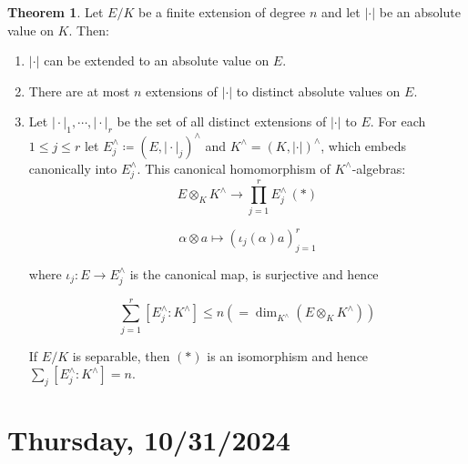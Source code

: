 \documentclass[openany]{amsbook}
\numberwithin{section}{chapter}
\theoremstyle{definition}
\newtheorem{theorem}{Theorem}[chapter]
\begin{document}
\begin{theorem}
    Let \(E / K\) be a finite extension of degree \(n\) and let \(\vert \cdot \vert\) be an absolute value on \(K\). Then:

    \begin{enumerate}[label=\roman*)]
        \item \(\vert \cdot \vert\) can be extended to an absolute value on \(E\).
        \item There are at most \(n\) extensions of \(\vert \cdot \vert\) to distinct absolute values on \(E\). 
        \item Let \(\vert \cdot \vert _1, \cdots , \vert \cdot \vert_r\) be the set of all distinct extensions of \(\vert \cdot \vert \) to \(E\). For each \(1 \leq j \leq r\) let \(E_j^\wedge  \coloneqq (E, \vert \cdot \vert _j)^\wedge\) and \(K^\wedge = (K, \vert \cdot \vert)^\wedge\), which embeds canonically into \(E_j^\wedge\). This canonical homomorphism of \(K^\wedge\)-algebras:
        \[
            E \otimes_K K^\wedge \to \prod_{j=1}^r E_j^\wedge \, (\ast)
        \]

        \[
            \alpha \otimes a \mapsto (\iota_j(\alpha)a)_{j=1}^r
        \]

        where \(\iota_j : E \to E_j^\wedge\) is the canonical map, is surjective and hence
        
        \[
            \sum_{j=1}^r [E_j^\wedge : K^\wedge] \leq n \left( = \dim_{K^\wedge} (E \otimes_K K^\wedge) \right) 
        \]

        If \(E / K\) is separable, then \((\ast)\) is an isomorphism and hence \(\sum_{j} [E_j^\wedge : K^\wedge] = n\).
    \end{enumerate} 
\end{theorem}

\section*{Thursday, 10/31/2024}
\end{document}
